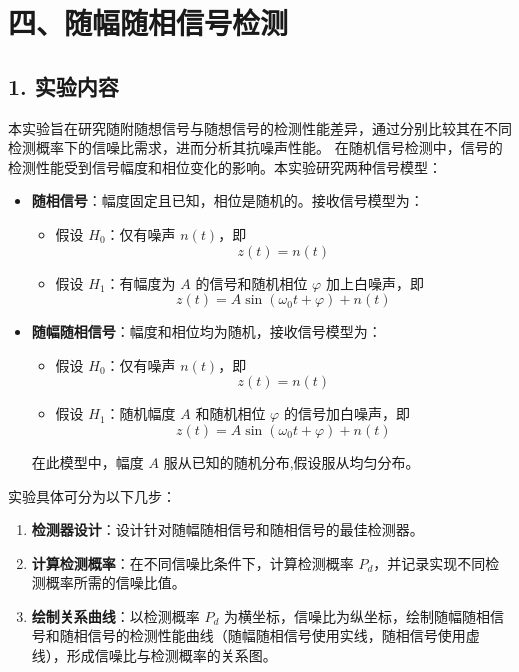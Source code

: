 \documentclass[12pt]{ctexart}
\begin{document}
\section*{四、随幅随相信号检测}

\subsection*{1. 实验内容}

本实验旨在研究随附随想信号与随想信号的检测性能差异，通过分别比较其在不同检测概率下的信噪比需求，进而分析其抗噪声性能。
在随机信号检测中，信号的检测性能受到信号幅度和相位变化的影响。本实验研究两种信号模型：

\begin{itemize}
    \item \textbf{随相信号}：幅度固定且已知，相位是随机的。接收信号模型为：
    \begin{itemize}
        \item 假设 \( H_0 \)：仅有噪声 \( n(t) \)，即 
        \[ z(t) = n(t) \]
        \item 假设 \( H_1 \)：有幅度为 \( A \) 的信号和随机相位 \( \varphi \) 加上白噪声，即 
        \[ z(t) = A \sin(\omega_0 t + \varphi) + n(t) \]
    \end{itemize}

    \item \textbf{随幅随相信号}：幅度和相位均为随机，接收信号模型为：
    \begin{itemize}
        \item 假设 \( H_0 \)：仅有噪声 \( n(t) \)，即 \[ z(t) = n(t) \]
        \item 假设 \( H_1 \)：随机幅度 \( A \) 和随机相位 \( \varphi \) 的信号加白噪声，即 \[ z(t) = A \sin(\omega_0 t + \varphi) + n(t) \]
    \end{itemize}

    在此模型中，幅度 $A$ 服从已知的随机分布,假设服从均匀分布。
\end{itemize}

实验具体可分为以下几步：

\begin{enumerate}
    \item \textbf{检测器设计}：设计针对随幅随相信号和随相信号的最佳检测器。
    \item \textbf{计算检测概率}：在不同信噪比条件下，计算检测概率 $P_d$，并记录实现不同检测概率所需的信噪比值。
    \item \textbf{绘制关系曲线}：以检测概率 $P_d$ 为横坐标，信噪比为纵坐标，绘制随幅随相信号和随相信号的检测性能曲线（随幅随相信号使用实线，随相信号使用虚线），形成信噪比与检测概率的关系图。
\end{enumerate}
\end{document}
